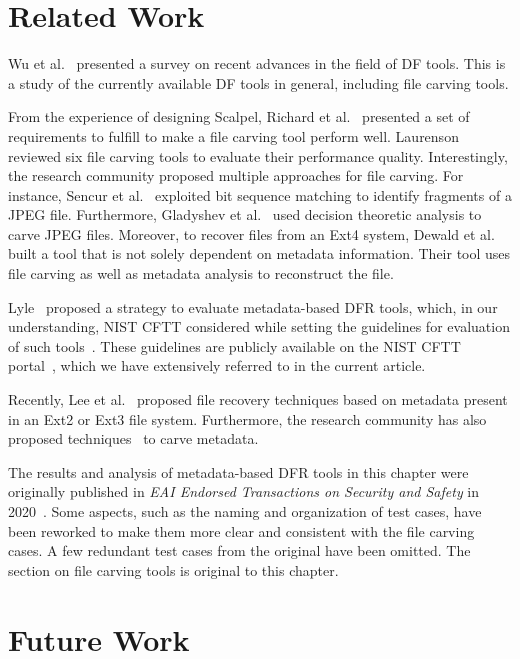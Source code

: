 \section{Related Work}

Wu et al.~\cite{wu2020digital} presented a survey on recent advances in the field of DF tools. 
This is a study of the currently available DF tools in general, including file carving tools.

From the experience of designing Scalpel, Richard et al.~\cite{richard2005scalpel} presented 
a set of requirements to fulfill to make a file carving tool perform well. 
Laurenson~\cite{laurenson2013performance} reviewed six file carving tools to evaluate their performance quality.
Interestingly, the research community proposed multiple approaches for file carving. 
For instance, Sencur et al.~\cite{sencar2009identification} exploited bit sequence 
matching to identify fragments of a JPEG file. Furthermore, Gladyshev 
et al.~\cite{gladyshev2017decision} used decision theoretic analysis to carve JPEG files.
Moreover, to recover files from an Ext4 system, Dewald et al.~\cite{dewald2017afeic} built a tool 
that is not solely dependent on metadata information. Their tool uses 
file carving as well as metadata analysis to reconstruct the file.

Lyle~\cite{lyle2011-ICDF2C} proposed a strategy to evaluate metadata-based DFR tools, 
which, in our understanding, NIST CFTT considered while setting the guidelines 
for evaluation of such tools~\cite{meta:dfr:standards}. These guidelines are 
publicly available on the NIST CFTT portal~\cite{cftt:nist}, which we have 
extensively referred to in the current article.

Recently, Lee et al.~\cite{lee2014improved,lee2019extsfr} proposed file recovery techniques based on 
metadata present in an Ext2 or Ext3 file system. Furthermore, the research community has also 
proposed techniques~\cite{nordvik2020generic,atwal2019shining} to carve metadata.

The results and analysis of metadata-based DFR tools in this chapter were originally published in \emph{EAI Endorsed Transactions on Security and Safety} in 2020~\cite{eai}.
Some aspects, such as the naming and organization of test cases, have been reworked to make them more clear and consistent with the file carving cases.
A few redundant test cases from the original have been omitted.
The section on file carving tools is original to this chapter.


\section{Future Work}

